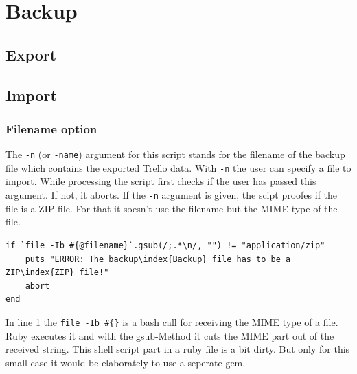 

\section{Backup}







\subsection{Export}

\subsection{Import}

\subsubsection{Filename option}
The \texttt{-n} (or \texttt{-name}) argument for this script stands for the filename of the backup file which contains the  exported Trello data. With \texttt{-n} the user can specify a file to import. While processing the script first checks if the user has passed this argument. If not, it aborts. If the \texttt{-n} argument is given, the scipt proofes if the file is a ZIP file. For that it soesn't use the filename but the MIME type of the file.


\begin{lstlisting}[aboveskip=1\baselineskip, caption=Checking if the file has the MIME type \textquotedblleft application/zip\textquotedblright, label=listing008]
if `file -Ib #{@filename}`.gsub(/;.*\n/, "") != "application/zip"
	puts "ERROR: The backup\index{Backup} file has to be a ZIP\index{ZIP} file!"
	abort
end
\end{lstlisting}

	
In line 1 the \texttt{file -Ib \#\{\@filename\}} is a bash call for receiving the MIME type of a file. Ruby executes it and with the gsub-Method it cuts the MIME part out of the received string. This shell script part in a ruby file is a bit dirty. But only for this small case it would be elaborately to use a seperate gem.

